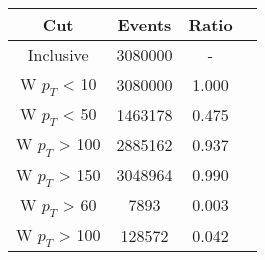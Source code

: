\begin{tabular}{|c||c|c|c|}
\hline
Cut & Events & Ratio\\\hline
Inclusive & 3080000 & - \\
W $p_{T}$ < 10 & 3080000 & 1.000 \\
W $p_{T}$ < 50 & 1463178 & 0.475 \\
W $p_{T}$ > 100 & 2885162 & 0.937 \\
W $p_{T}$ > 150 & 3048964 & 0.990 \\
W $p_{T}$ > 60 & 7893 & 0.003 \\
W $p_{T}$ > 100 & 128572 & 0.042 \\
\end{tabular}